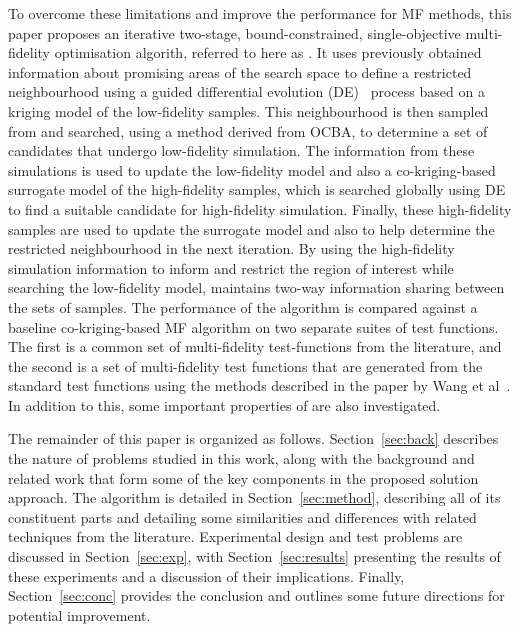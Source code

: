 To overcome these limitations and improve the performance for MF methods, this paper proposes an iterative two-stage, bound-constrained, single-objective multi-fidelity optimisation algorith, referred to here as \AlgName{}. It uses previously obtained information about promising areas of the search space to define a restricted neighbourhood using a guided differential evolution (DE)~\cite{storn1997differential} process based on a kriging model of the low-fidelity samples. This neighbourhood is then sampled from and searched, using a method derived from OCBA, to determine a set of candidates that undergo low-fidelity simulation. The information from these simulations is used to update the low-fidelity model and also a co-kriging-based surrogate model of the high-fidelity samples, which is searched globally using DE to find a suitable candidate for high-fidelity simulation. Finally, these high-fidelity samples are used to update the surrogate model and also to help determine the restricted neighbourhood in the next iteration. By using the high-fidelity simulation information to inform and restrict the region of interest while searching the low-fidelity model, \AlgName{} maintains two-way information sharing between the sets of samples. The performance of the \AlgName{} algorithm is compared against a baseline co-kriging-based MF algorithm on two separate suites of test functions. The first is a common set of multi-fidelity test-functions from the literature, and the second is a set of multi-fidelity test functions that are generated from the standard test functions using the methods described in the paper by Wang et al~\cite{wang2017generic}. In addition to this, some important properties of \AlgName{} are also investigated.

The remainder of this paper is organized as follows. Section~\ref{sec:back} describes the nature of problems studied in this work, along with the background and related work that form some of the key components in the proposed solution approach. The \AlgName{} algorithm is detailed in Section~\ref{sec:method}, describing all of its constituent parts and detailing some similarities and differences with related techniques from the literature. Experimental design and test problems are discussed in Section~\ref{sec:exp}, with Section~\ref{sec:results} presenting the results of these experiments and a discussion of their implications. Finally, Section~\ref{sec:conc} provides the conclusion and outlines some future directions for potential improvement.
